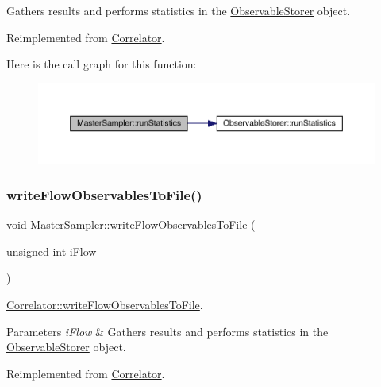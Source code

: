 Gathers results and performs statistics in the \mbox{\hyperlink{class_observable_storer}{Observable\+Storer}} object. 

Reimplemented from \mbox{\hyperlink{class_correlator_a35197b1d12b62ef30b79c0138a26456e}{Correlator}}.

Here is the call graph for this function\+:\nopagebreak
\begin{figure}[H]
\begin{center}
\leavevmode
\includegraphics[width=350pt]{class_master_sampler_ab7913d0dbdea57af3f469a3cdd74f8fc_cgraph}
\end{center}
\end{figure}
\mbox{\label{class_master_sampler_ad475928217ac61fae134128904aaa9f8}} 
\subsubsection{\texorpdfstring{writeFlowObservablesToFile()}{writeFlowObservablesToFile()}}
{\footnotesize\ttfamily void Master\+Sampler\+::write\+Flow\+Observables\+To\+File (\begin{DoxyParamCaption}\item[{unsigned int}]{i\+Flow }\end{DoxyParamCaption})\hspace{0.3cm}{\ttfamily [virtual]}}



\mbox{\hyperlink{class_correlator_a168512b2ce182d9478db47f100125fa6}{Correlator\+::write\+Flow\+Observables\+To\+File}}. 


\begin{DoxyParams}{Parameters}
{\em i\+Flow} & Gathers results and performs statistics in the \mbox{\hyperlink{class_observable_storer}{Observable\+Storer}} object. \\
\hline
\end{DoxyParams}


Reimplemented from \mbox{\hyperlink{class_correlator_a168512b2ce182d9478db47f100125fa6}{Correlator}}.

